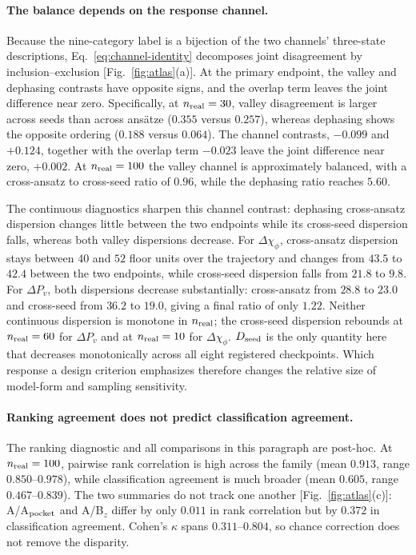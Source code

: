 \documentclass[aip,jap,reprint,superscriptaddress,longbibliography,floatfix]{revtex4-2}
\begin{document}
\paragraph{The balance depends on the response channel.}
Because the nine-category label is a bijection of the two channels'
three-state descriptions, Eq.~\eqref{eq:channel-identity} decomposes joint
disagreement by inclusion--exclusion [Fig.~\ref{fig:atlas}(a)]. At the primary
endpoint, the valley and dephasing contrasts have opposite signs, and the
overlap term leaves the joint difference near zero. Specifically, at
$n_{\rm real}=30$, valley disagreement is larger across seeds than across
ans\"atze ($0.355$ versus $0.257$), whereas dephasing shows the opposite
ordering ($0.188$ versus $0.064$). The channel contrasts, $-0.099$ and
$+0.124$, together with the overlap term $-0.023$ leave the joint difference
near zero, $+0.002$. At $n_{\rm real}=100$ the valley channel is approximately
balanced, with a cross-ansatz to cross-seed ratio of $0.96$, while the
dephasing ratio reaches $5.60$.

The continuous diagnostics sharpen this channel contrast: dephasing
cross-ansatz dispersion changes little between the two endpoints while its
cross-seed dispersion falls, whereas both valley dispersions decrease. For
$\Delta\chi_\phi$, cross-ansatz dispersion stays between $40$ and $52$ floor
units over the trajectory and changes from $43.5$ to $42.4$ between the two
endpoints, while cross-seed dispersion falls from $21.8$ to $9.8$. For
$\Delta P_v$, both dispersions decrease substantially: cross-ansatz from
$28.8$ to $23.0$ and cross-seed from $36.2$ to $19.0$, giving a final ratio of
only $1.22$. Neither continuous dispersion is monotone in $n_{\rm real}$;
the cross-seed dispersion rebounds at $n_{\rm real}=60$ for $\Delta P_v$ and
at $n_{\rm real}=10$ for $\Delta\chi_\phi$. $D_{\rm seed}$ is the only
quantity here that decreases monotonically across all eight registered
checkpoints. Which response a design criterion emphasizes therefore
changes the relative size of model-form and sampling sensitivity.

\paragraph{Ranking agreement does not predict classification agreement.}
The ranking diagnostic and all comparisons in this paragraph are post-hoc. At
$n_{\rm real}=100$, pairwise rank correlation is high across the family
(mean $0.913$, range $0.850$--$0.978$), while classification agreement is
much broader (mean $0.605$, range $0.467$--$0.839$). The two summaries do not track one another
[Fig.~\ref{fig:atlas}(c)]: A/A$_{\rm pocket}$ and A/B$_z$ differ by only
$0.011$ in rank correlation but by $0.372$ in classification
agreement. Cohen's $\kappa$ spans $0.311$--$0.804$, so chance correction does
not remove the disparity.
\end{document}
